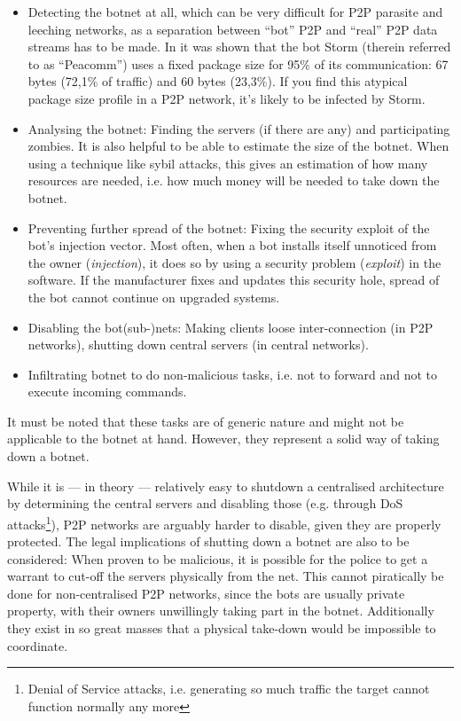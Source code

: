 \documentclass{llncs}
\begin{document}
\begin{itemize}
\item Detecting the botnet at all, which can be very difficult for P2P
  parasite and leeching networks, as a separation between ``bot'' P2P
  and ``real'' P2P data streams has to be made. In
  \cite{steggink2007detection} it was shown that the bot Storm
  (therein referred to as ``Peacomm'') uses a fixed package size for
  95\% of its communication: 67 bytes (72,1\% of traffic) and 60 bytes
  (23,3\%). If you find this atypical package size profile in a P2P
  network, it's likely to be infected by Storm.
\item Analysing the botnet: Finding the servers (if there are any) and
  participating zombies. It is also helpful to be able to estimate the
  size of the botnet. When using a technique like sybil attacks, this
  gives an estimation of how many resources are needed, i.e. how much
  money will be needed to take down the botnet.
\item Preventing further spread of the botnet: Fixing the security
  exploit of the bot's injection vector. Most often, when a bot
  installs itself unnoticed from the owner ({\it injection}), it does so by
  using a security problem ({\it exploit}) in the software. If the
  manufacturer fixes and updates this security hole, spread of the bot
  cannot continue on upgraded systems.
\item Disabling the bot(sub-)nets: Making clients loose
  inter-connection (in P2P networks), shutting down central servers
  (in central networks).
\item Infiltrating botnet to do non-malicious tasks, i.e. not to
  forward and not to execute incoming commands.
\end{itemize}

It must be noted that these tasks are of generic nature and might not
be applicable to the botnet at hand. However, they represent a solid
way of taking down a botnet.

While it is --- in theory --- relatively easy to shutdown a
centralised architecture by determining the central servers and
disabling those (e.g. through DoS attacks\footnote{Denial of Service
  attacks, i.e. generating so much traffic the target cannot function
  normally any more}), P2P networks are arguably harder to disable,
given they are properly protected. The legal implications of shutting
down a botnet are also to be considered: When proven to be malicious,
it is possible for the police to get a warrant to cut-off the servers
physically from the net. This cannot piratically be done for
non-centralised P2P networks, since the bots are usually private
property, with their owners unwillingly taking part in the
botnet. Additionally they exist in so great masses that a physical
take-down would be impossible to coordinate.
\end{document}
